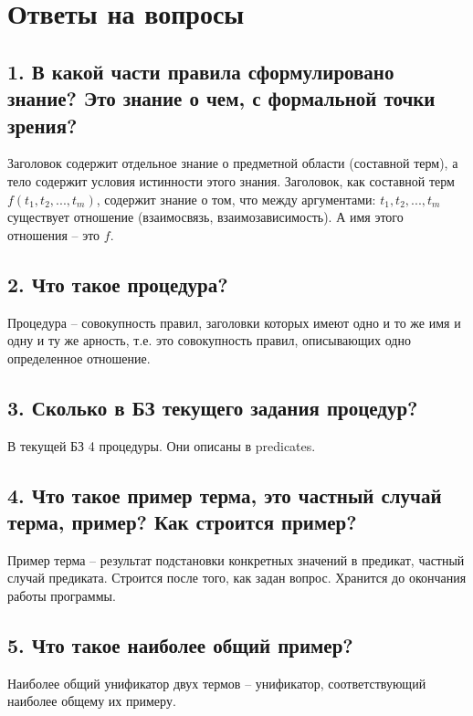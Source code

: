 \documentclass[a4paper,12pt]{article}
\begin{document}
	
	\newpage
	
	\section*{Ответы на вопросы}
	
	\subsection*{1.	В какой части правила сформулировано знание? Это знание о чем, с формальной точки зрения?}
	
	Заголовок содержит отдельное знание о предметной области (составной
	терм), а тело содержит условия истинности этого знания.
	Заголовок, как составной терм $f(t_1, t_2, ..., t_m)$, содержит знание о том, что
	между аргументами: $t_1, t_2, ..., t_m$ существует отношение (взаимосвязь, взаимозависимость). А имя этого отношения – это $f$.
	
	\subsection*{2.	Что такое процедура?}
	
	Процедура – совокупность правил, заголовки которых имеют одно и то же
	имя и одну и ту же арность, т.е. это совокупность правил, описывающих одно
	определенное отношение.
	
	\subsection*{3.	Сколько в БЗ текущего задания процедур?}
	
	В текущей БЗ 4 процедуры. Они описаны в predicates.
	
	\subsection*{4.	Что такое пример терма, это частный случай терма, пример? Как строится пример? }
	
	Пример терма – результат подстановки конкретных значений в предикат,
	частный случай предиката. Строится после того, как задан вопрос. Хранится
	до окончания работы программы.
	
	\subsection*{5.	Что такое наиболее общий пример?}
	
	Наиболее общий унификатор двух термов – унификатор, соответствующий
	наиболее общему их примеру.
	
\end{document}
